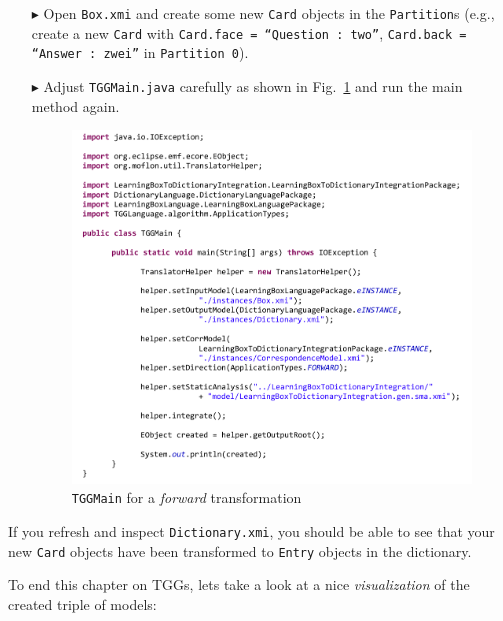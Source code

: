 \begin{enumerate}
\item[$\blacktriangleright$] Open \texttt{Box.xmi} and create some new \texttt{Card} objects in the \texttt{Partition}s (e.g., create a new \texttt{Card} with \texttt{Card.face = ``Question : two''}, \texttt{Card.back = ``Answer : zwei''} in \texttt{Partition 0}). 

\item[$\blacktriangleright$] Adjust \texttt{TGGMain.java} carefully as shown in Fig.~\ref{fig:tggmainforward} and run the main method again.

\begin{figure}[htbp]
\begin{center}
  \includegraphics[width=\textwidth]{pics/tggBilder/transformation/tgg28}
  \caption{\texttt{TGGMain} for a \emph{forward} transformation}  
  \label{fig:tggmainforward}
\end{center}
\end{figure} 

\end{enumerate}

If you refresh and inspect \texttt{Dictionary.xmi}, you should be able to see that your new \texttt{Card} objects have been transformed to \texttt{Entry} objects in the dictionary.

To end this chapter on TGGs, lets take a look at a nice \emph{visualization} of the created triple of models:

